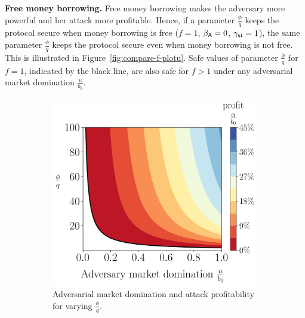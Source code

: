\noindent
\textbf{Free money borrowing.}
Free money borrowing makes the adversary more powerful and her attack
more profitable.
Hence, if a parameter $\frac{\phi}{q}$ keeps the protocol secure when money
borrowing is free ($f = 1$, $\beta_{\textsf{A}} = 0$, $\gamma_{\textsf{st}} = 1$),
the same parameter $\frac{\phi}{q}$ keeps the protocol secure even when
money borrowing is not free. This is illustrated in
Figure~\ref{fig:compare-f-plotu}. Safe values of parameter $\frac{\phi}{q}$
for $f = 1$, indicated by the black line, are also safe for $f > 1$
under any adversarial market domination $\frac{u}{b_0}$.


\begin{figure}[htb]
  \centering
  \begin{subfigure}{0.49\textwidth}
    \centering
    \includegraphics[width=\textwidth]{./plots/plotu.pdf}
    \caption{Adversarial market domination and attack profitability
             for varying $\frac{\phi}{q}$.}
    \label{fig:contour-plotu}
  \end{subfigure}
  \hfill
  \begin{subfigure}{0.49\textwidth}
    \centering

\end{subfigure}
\end{figure}
